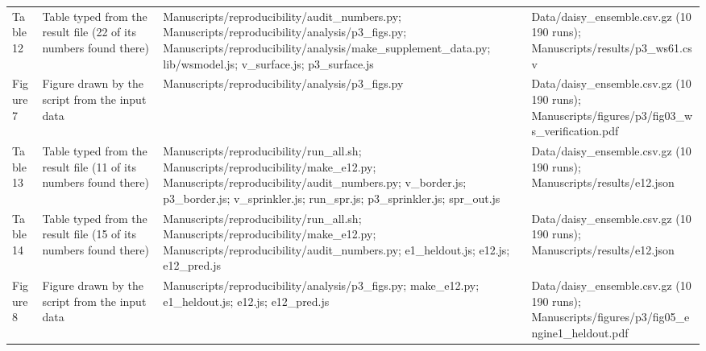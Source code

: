 {\begin{longtable}{p{}p{}p{}p{}}
{}Table 12 & Table typed from the result file (22 of its numbers found there) & Manuscripts/\allowbreak{}reproducibility/\allowbreak{}audit\_\allowbreak{}numbers.py;  Manuscripts/\allowbreak{}reproducibility/\allowbreak{}analysis/\allowbreak{}p3\_\allowbreak{}figs.py;  Manuscripts/\allowbreak{}reproducibility/\allowbreak{}analysis/\allowbreak{}make\_\allowbreak{}supplement\_\allowbreak{}data.py;  lib/\allowbreak{}wsmodel.js;  v\_\allowbreak{}surface.js;  p3\_\allowbreak{}surface.js & Data/\allowbreak{}daisy\_\allowbreak{}ensemble.csv.gz (10 190 runs);  Manuscripts/\allowbreak{}results/\allowbreak{}p3\_\allowbreak{}ws61.csv\\
{}Figure 7 & Figure drawn by the script from the input data & Manuscripts/\allowbreak{}reproducibility/\allowbreak{}analysis/\allowbreak{}p3\_\allowbreak{}figs.py & Data/\allowbreak{}daisy\_\allowbreak{}ensemble.csv.gz (10 190 runs);  Manuscripts/\allowbreak{}figures/\allowbreak{}p3/\allowbreak{}fig03\_\allowbreak{}ws\_\allowbreak{}verification.pdf\\
{}Table 13 & Table typed from the result file (11 of its numbers found there) & Manuscripts/\allowbreak{}reproducibility/\allowbreak{}run\_\allowbreak{}all.sh;  Manuscripts/\allowbreak{}reproducibility/\allowbreak{}make\_\allowbreak{}e12.py;  Manuscripts/\allowbreak{}reproducibility/\allowbreak{}audit\_\allowbreak{}numbers.py;  v\_\allowbreak{}border.js;  p3\_\allowbreak{}border.js;  v\_\allowbreak{}sprinkler.js;  run\_\allowbreak{}spr.js;  p3\_\allowbreak{}sprinkler.js;  spr\_\allowbreak{}out.js & Data/\allowbreak{}daisy\_\allowbreak{}ensemble.csv.gz (10 190 runs);  Manuscripts/\allowbreak{}results/\allowbreak{}e12.json\\
{}Table 14 & Table typed from the result file (15 of its numbers found there) & Manuscripts/\allowbreak{}reproducibility/\allowbreak{}run\_\allowbreak{}all.sh;  Manuscripts/\allowbreak{}reproducibility/\allowbreak{}make\_\allowbreak{}e12.py;  Manuscripts/\allowbreak{}reproducibility/\allowbreak{}audit\_\allowbreak{}numbers.py;  e1\_\allowbreak{}heldout.js;  e12.js;  e12\_\allowbreak{}pred.js & Data/\allowbreak{}daisy\_\allowbreak{}ensemble.csv.gz (10 190 runs);  Manuscripts/\allowbreak{}results/\allowbreak{}e12.json\\
{}Figure 8 & Figure drawn by the script from the input data & Manuscripts/\allowbreak{}reproducibility/\allowbreak{}analysis/\allowbreak{}p3\_\allowbreak{}figs.py;  make\_\allowbreak{}e12.py;  e1\_\allowbreak{}heldout.js;  e12.js;  e12\_\allowbreak{}pred.js & Data/\allowbreak{}daisy\_\allowbreak{}ensemble.csv.gz (10 190 runs);  Manuscripts/\allowbreak{}figures/\allowbreak{}p3/\allowbreak{}fig05\_\allowbreak{}engine1\_\allowbreak{}heldout.pdf\\

\end{longtable}}
